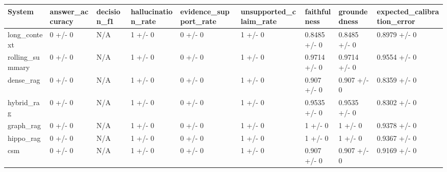 \begin{tabular}{lllllllll}
System & answer_accuracy & decision_f1 & hallucination_rate & evidence_support_rate & unsupported_claim_rate & faithfulness & groundedness & expected_calibration_error \\
\hline
long\_context & 0 +/- 0 & N/A & 1 +/- 0 & 0 +/- 0 & 1 +/- 0 & 0.8485 +/- 0 & 0.8485 +/- 0 & 0.8979 +/- 0 \\
rolling\_summary & 0 +/- 0 & N/A & 1 +/- 0 & 0 +/- 0 & 1 +/- 0 & 0.9714 +/- 0 & 0.9714 +/- 0 & 0.9554 +/- 0 \\
dense\_rag & 0 +/- 0 & N/A & 1 +/- 0 & 0 +/- 0 & 1 +/- 0 & 0.907 +/- 0 & 0.907 +/- 0 & 0.8359 +/- 0 \\
hybrid\_rag & 0 +/- 0 & N/A & 1 +/- 0 & 0 +/- 0 & 1 +/- 0 & 0.9535 +/- 0 & 0.9535 +/- 0 & 0.8302 +/- 0 \\
graph\_rag & 0 +/- 0 & N/A & 1 +/- 0 & 0 +/- 0 & 1 +/- 0 & 1 +/- 0 & 1 +/- 0 & 0.9378 +/- 0 \\
hippo\_rag & 0 +/- 0 & N/A & 1 +/- 0 & 0 +/- 0 & 1 +/- 0 & 1 +/- 0 & 1 +/- 0 & 0.9367 +/- 0 \\
csm & 0 +/- 0 & N/A & 1 +/- 0 & 0 +/- 0 & 1 +/- 0 & 0.907 +/- 0 & 0.907 +/- 0 & 0.9169 +/- 0 \\
\end{tabular}
